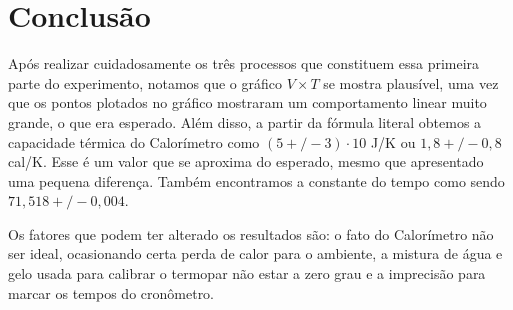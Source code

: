 \documentclass[a4paper]{article}
\begin{document}
\section{Conclusão}
	Após realizar cuidadosamente os três processos que constituem essa primeira parte do experimento, notamos que o gráfico $V \times T$ se mostra plausível, uma vez que os pontos plotados no gráfico mostraram um comportamento linear muito grande, o que era esperado. Além disso, a partir da fórmula literal obtemos a capacidade térmica do Calorímetro como $(5 +/- 3) \cdot 10$ J/K ou $1,8 +/- 0,8$ cal/K. Esse é um valor que se aproxima do esperado, mesmo que apresentado uma pequena diferença. Também encontramos a constante do tempo como sendo $71,518 +/- 0,004$. 

Os fatores que podem ter alterado os resultados são: o fato do Calorímetro não ser ideal, ocasionando certa perda de calor para o ambiente, a mistura de água e gelo usada para calibrar o termopar não estar a zero grau e a imprecisão para marcar os tempos do cronômetro.
\end{document}
